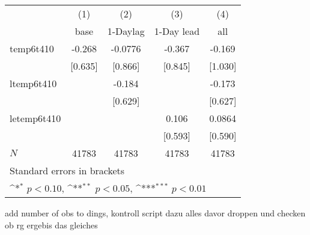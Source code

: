{
\def\sym#1{\ifmmode^{#1}\else\(^{#1}\)\fi}
\begin{tabular}{l*{4}{c}}
\hline\hline
            &\multicolumn{1}{c}{(1)}&\multicolumn{1}{c}{(2)}&\multicolumn{1}{c}{(3)}&\multicolumn{1}{c}{(4)}\\
            &\multicolumn{1}{c}{base}&\multicolumn{1}{c}{1-Daylag}&\multicolumn{1}{c}{1-Day lead}&\multicolumn{1}{c}{all}\\
\hline
temp6t410   &      -0.268         &     -0.0776         &      -0.367         &      -0.169         \\
            &     [0.635]         &     [0.866]         &     [0.845]         &     [1.030]         \\
[1em]
ltemp6t410  &                     &      -0.184         &                     &      -0.173         \\
            &                     &     [0.629]         &                     &     [0.627]         \\
[1em]
letemp6t410 &                     &                     &       0.106         &      0.0864         \\
            &                     &                     &     [0.593]         &     [0.590]         \\
\hline
\(N\)       &       41783         &       41783         &       41783         &       41783         \\
\hline\hline
\multicolumn{5}{l}{\footnotesize Standard errors in brackets}\\
\multicolumn{5}{l}{\footnotesize \sym{*} \(p<0.10\), \sym{**} \(p<0.05\), \sym{***} \(p<0.01\)}\\
\end{tabular}
}


add number of obs to dings, kontroll script dazu alles davor droppen und checken ob rg ergebis das gleiches